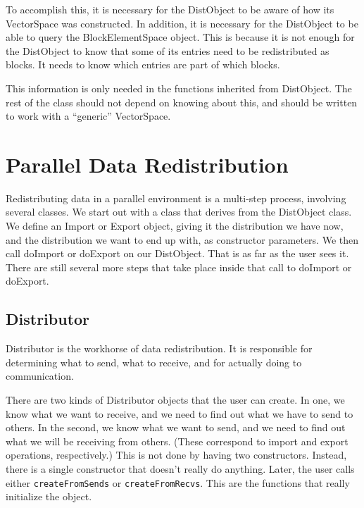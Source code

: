 \documentclass[10pt,relax]{TpetraDesign}
\begin{document}
To accomplish this, it is necessary for the DistObject to be aware of how its VectorSpace was constructed. In addition, it is necessary for the DistObject to be able to query the BlockElementSpace object. This is because it is not enough for the DistObject to know that some of its entries need to be redistributed as blocks. It needs to know which entries are part of which blocks.

This information is only needed in the functions inherited from DistObject. The rest of the class should not depend on knowing about this, and should be written to work with a ``generic'' VectorSpace.

%
\section{Parallel Data Redistribution}

Redistributing data in a parallel environment is a multi-step process, involving several classes. We start out with a class that derives from the DistObject class. We define an Import or Export object, giving it the distribution we have now, and the distribution we want to end up with, as constructor parameters. We then call doImport or doExport on our DistObject. That is as far as the user sees it. There are still several more steps that take place inside that call to doImport or doExport.

%
\subsection{Distributor}

Distributor is the workhorse of data redistribution. It is responsible for determining what to send, what to receive, and for actually doing to communication.

There are two kinds of Distributor objects that the user can create. In one, we know what we want to receive, and we need to find out what we have to send to others. In the second, we know what we want to send, and we need to find out what we will be receiving from others. (These correspond to import and export operations, respectively.) This is not done by having two constructors. Instead, there is a single constructor that doesn't really do anything. Later, the user calls either \texttt{createFromSends} or \texttt{createFromRecvs}. This are the functions that really initialize the object.
\end{document}
